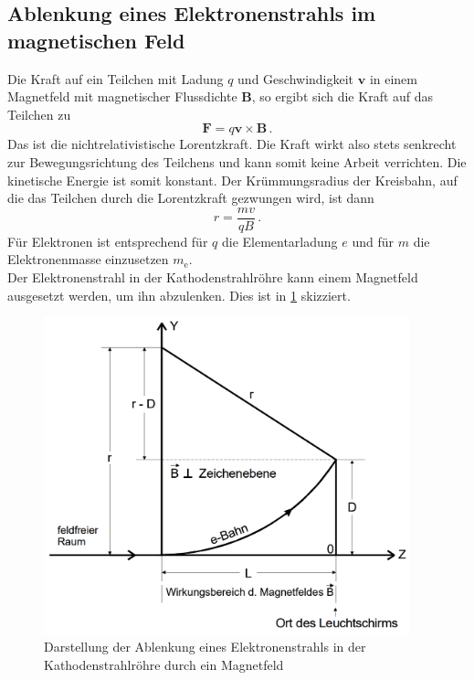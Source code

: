 \subsection{Ablenkung eines Elektronenstrahls im magnetischen Feld}
\label{subsec:immagnetfeld}
Die Kraft auf ein Teilchen mit Ladung $q$ und Geschwindigkeit $\symbf{v}$ in einem
Magnetfeld mit magnetischer Flussdichte $\symbf{B}$, so ergibt sich die Kraft
auf das Teilchen zu
\begin{equation}
  \symbf{F} = q \symbf{v} \times \symbf{B}\,.
  \label{eqn:lorentz}
\end{equation}
Das ist die nichtrelativistische Lorentzkraft. Die Kraft wirkt also stets senkrecht
zur Bewegungsrichtung des Teilchens und kann somit keine Arbeit verrichten.
Die kinetische Energie ist somit konstant.
Der Krümmungsradius der Kreisbahn, auf die das Teilchen durch die Lorentzkraft gezwungen
wird, ist dann
\begin{equation}
  r = \frac{m v}{q B}\,.
  \label{eqn:kruemmung}
\end{equation}
Für Elektronen ist entsprechend für $q$ die Elementarladung $e$ und für $m$ die Elektronenmasse
einzusetzen $m_\text{e}$. \\
Der Elektronenstrahl in der Kathodenstrahlröhre kann einem Magnetfeld ausgesetzt werden,
um ihn abzulenken. Dies ist in \ref{fig:magnetkathode} skizziert.

\begin{figure}[H]
  \centering
  \includegraphics[width=300pt]{data/immagnetfeld.png}
  \caption{Darstellung der Ablenkung eines Elektronenstrahls in der Kathodenstrahlröhre durch ein Magnetfeld\cite{Versuchsanleitung502}}
  \label{fig:magnetkathode}
\end{figure}

